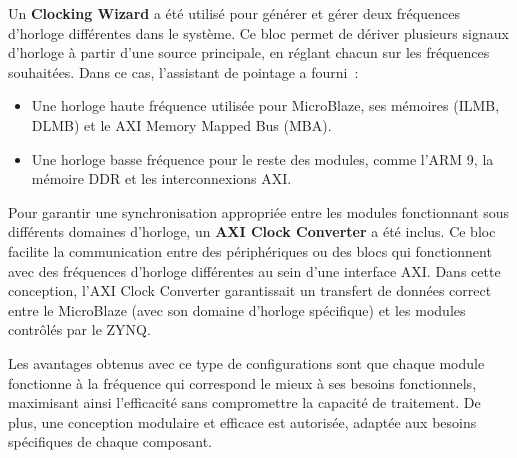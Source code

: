 \documentclass[../CSC_5RO07_TA.tex]{subfiles}
\begin{document}
Un \textbf{Clocking Wizard} a été utilisé pour générer et gérer deux fréquences d'horloge différentes dans le système. Ce bloc permet de dériver plusieurs signaux d'horloge à partir d'une source principale, en réglant chacun sur les fréquences souhaitées.
Dans ce cas, l'assistant de pointage a fourni :

\begin{itemize}
    \item Une horloge haute fréquence utilisée pour MicroBlaze, ses mémoires (ILMB, DLMB) et le AXI Memory Mapped Bus (MBA).
    \item Une horloge basse fréquence pour le reste des modules, comme l'ARM 9, la mémoire DDR et les interconnexions AXI.
\end{itemize}

Pour garantir une synchronisation appropriée entre les modules fonctionnant sous différents domaines d'horloge, un \textbf{AXI Clock Converter} a été inclus. Ce bloc facilite la communication entre des périphériques ou des blocs qui fonctionnent avec des fréquences d'horloge différentes au sein d'une interface AXI. Dans cette conception, l'AXI Clock Converter garantissait un transfert de données correct entre le MicroBlaze (avec son domaine d'horloge spécifique) et les modules contrôlés par le ZYNQ.

\vspace{1em} 

Les avantages obtenus avec ce type de configurations sont que chaque module fonctionne à la fréquence qui correspond le mieux à ses besoins fonctionnels, maximisant ainsi l'efficacité sans compromettre la capacité de traitement. De plus, une conception modulaire et efficace est autorisée, adaptée aux besoins spécifiques de chaque composant.
\end{document}
